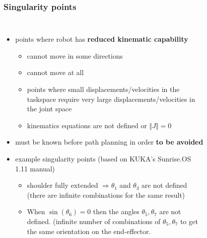 \begin{frame}
\frametitle{Singularity points}
\begin{columns}
\begin{itemize}
\item points where robot has \textbf{reduced kinematic capability}
	\begin{itemize}
	\item cannot move in some directions
	\item cannot move at all
	\item points where small displacements/velocities in the taskspace require very large displacements/velocities in the joint space
	\item kinematics equations are not defined or $\Vert J \Vert = 0$
	\end{itemize}
\item must be known before path planning in order \textbf{to be avoided}
\item example singularity points (based on KUKA's Sunrise.OS 1.11 manual)
	\begin{itemize}
	\item shoulder fully extended $\Rightarrow θ_1$ and $θ_3$ are not defined (there are infinite combinations for the same result)
	\item When $\sin\left( θ_6 \right) = 0$ then the angles $θ_5, θ_7$ are not defined. (infinite number of combinations of
	$θ_5, θ_7$ to get the same orientation on the end-effector.
	\end{itemize}
\end{itemize}
\begin{figure}[htbp]
\centering

\end{figure}
\end{columns}
\end{frame}
